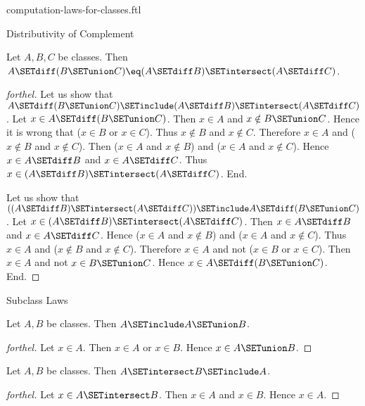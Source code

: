 \documentclass{naproche-library}
\begin{document}
\begin{smodule}[title=Computation Laws For Classes]{computation-laws-for-classes.ftl}
\begin{sfragment}{Distributivity of Complement}
  \begin{proposition}[forthel,id=FOUNDATIONS_02_2909554153095168]
    Let $A, B, C$ be classes.
    Then $A \SETdiff (B \SETunion C) \eq (A \SETdiff B) \SETintersect (A \SETdiff C)$.
  \end{proposition}
  \begin{proof}[forthel]
    Let us show that $A \SETdiff (B \SETunion C) \SETinclude (A \SETdiff B) \SETintersect (A \SETdiff C)$.
      Let $x \in A \SETdiff (B \SETunion C)$.
      Then $x \in A$ and $x \notin B \SETunion C$.
      Hence it is wrong that ($x \in B$ or $x \in C$).
      Thus $x \notin B$ and $x \notin C$.
      Therefore $x \in A$ and ($x \notin B$ and $x \notin C$).
      Then ($x \in A$ and $x \notin B$) and ($x \in A$ and $x \notin C$).
      Hence $x \in A \SETdiff B$ and $x \in A \SETdiff C$.
      Thus $x \in (A \SETdiff B) \SETintersect (A \SETdiff C)$.
    End.

    Let us show that $((A \SETdiff B) \SETintersect (A \SETdiff C)) \SETinclude A \SETdiff (B \SETunion C)$. %
      Let $x \in (A \SETdiff B) \SETintersect (A \SETdiff C)$.
      Then $x \in A \SETdiff B$ and $x \in A \SETdiff C$.
      Hence ($x \in A$ and $x \notin B$) and ($x \in A$ and $x \notin C$).
      Thus $x \in A$ and ($x \notin B$ and $x \notin C$).
      Therefore $x \in A$ and not ($x \in B$ or $x \in C$).
      Then $x \in A$ and not $x \in B \SETunion C$.
      Hence $x \in A \SETdiff (B \SETunion C)$.
    End.
  \end{proof}
\end{sfragment}

\begin{sfragment}{Subclass Laws}
  \begin{proposition}[forthel,id=FOUNDATIONS_02_3793981508943872]
    Let $A, B$ be classes.
    Then $A \SETinclude A \SETunion B$.
  \end{proposition}
  \begin{proof}[forthel]
    Let $x \in A$.
    Then $x \in A$ or $x \in B$.
    Hence $x \in A \SETunion B$.
  \end{proof}

  \begin{proposition}[forthel,id=FOUNDATIONS_02_1591517646946304]
    Let $A, B$ be classes.
    Then $A \SETintersect B \SETinclude A$.
  \end{proposition}
  \begin{proof}[forthel]
    Let $x \in A \SETintersect B$.
    Then $x \in A$ and $x \in B$.
    Hence $x \in A$.
  \end{proof}


\end{sfragment}
\end{smodule}
\end{document}
